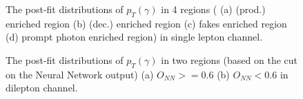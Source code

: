 \begin{figure}[ht]
  \caption{The post-fit distributions of $p_T(\gamma)$ in 4 regions ( (a) \tty (prod.) enriched region  (b) \tty (dec.) enriched region
  (c) fakes enriched region (d) prompt photon enriched region) in single lepton channel. }
  \label{fig:pt_postfit_ljet_realdata}
\end{figure}
\FloatBarrier


\begin{figure}[ht]
  \centering
  \quad \quad
  \caption{The post-fit distributions of $p_T(\gamma)$ in two regions (based on the cut on the Neural Network output) (a) $O_{NN}>=0.6$ (b) $O_{NN}<0.6$ 
  in dilepton channel.}
  \label{fig:pt_postfit_dilep_realdata}
\end{figure}
\FloatBarrier



